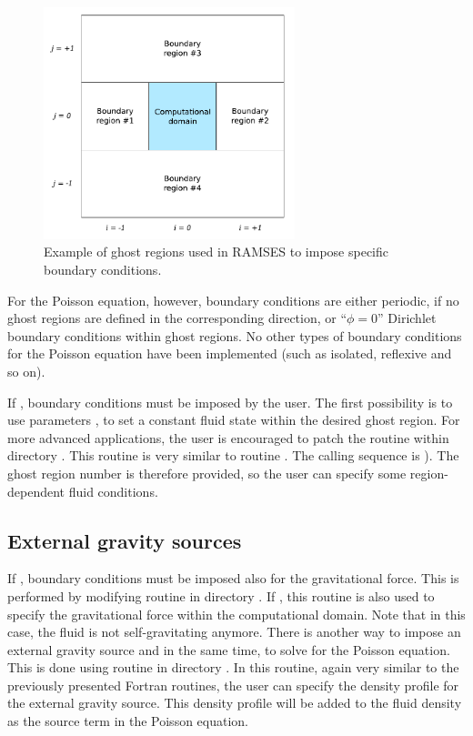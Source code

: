 \begin{figure}
   \begin{center}
   \includegraphics[width=0.65\textwidth]{img/bc.pdf}
   \end{center}
   \caption{Example of ghost regions used in RAMSES to impose specific boundary
conditions.}
   \label{fig:bc}
\end{figure}

For the Poisson equation, however, boundary conditions are either periodic, if
no ghost regions are defined in the corresponding direction, or ``$\phi=0$''
Dirichlet boundary conditions within ghost regions. No other types of boundary
conditions for the Poisson equation have been implemented (such as isolated,
reflexive and so on). 

If , boundary conditions must be imposed by the
user. The first possibility is to use parameters ,
 to set a constant fluid state within the desired
ghost region. For more advanced applications, the user is encouraged to patch
the routine  within directory . This routine is
very similar to routine . The calling sequence is ). The ghost region number is therefore provided,
so the user can specify some region-dependent fluid conditions.

\subsection{External gravity sources}

If , boundary conditions must be imposed also for
the gravitational force. This is performed by modifying routine
 in directory . If , this
routine is also used to specify the gravitational force within the
computational domain. Note that in this case, the fluid is not self-gravitating
anymore. There is another way to impose an external gravity source and in the
same time, to solve for the Poisson equation. This is done using routine
 in directory . In this routine, again very
similar to the previously presented Fortran routines, the user can specify the
density profile for the external gravity source.  This density profile will be
added to the fluid density as the source term in the Poisson equation.

